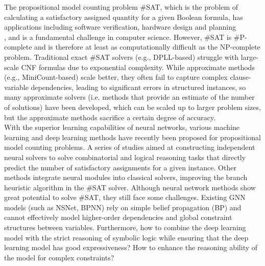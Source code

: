 The propositional model counting problem \#SAT, which is the problem of calculating a satisfactory assigned quantity for a given Boolean formula, has applications including software verification\cite{A1}\cite{A2}, hardware design and planning\cite{B1}\cite{B2}\\ \cite{A3}, and is a fundamental challenge in computer science. However, \#SAT is \#P-complete and is therefore at least as computationally difficult as the NP-complete problem. Traditional exact \#SAT solvers (e.g., DPLL-based)\cite{A4}\cite{A5} struggle with large-scale CNF formulas due to exponential complexity. While approximate methods (e.g., MiniCount-based)\cite{A6} scale better, they often fail to capture complex clause-variable dependencies, leading to significant errors in structured instances, so many approximate solvers (i.e. methods that provide an estimate of the number of solutions) have been developed, which can be scaled up to larger problem sizes, but the approximate methods sacrifice a certain degree of accuracy.\\
With the superior learning capabilities of neural networks, various machine learning and deep learning methods have recently been proposed for propositional model counting problems\cite{A7}\cite{B3}\cite{B4}. A series of studies aimed at constructing independent neural solvers to solve combinatorial and logical reasoning tasks that directly predict the number of satisfactory assignments for a given instance\cite{A8}\cite{A9}. Other methods integrate neural modules into classical solvers, improving the branch heuristic algorithm in the \#SAT solver\cite{A10}. Although neural network methods show great potential to solve \#SAT, they still face some challenges. Existing GNN models (such as NSNet\cite{A11}, BPNN\cite{A12}) rely on simple belief propagation (BP) and cannot effectively model higher-order dependencies and global constraint structures between variables. Furthermore, how to combine the deep learning model with the strict reasoning of symbolic logic while ensuring that the deep learning model has good expressiveness?\cite{A12} How to enhance the reasoning ability of the model for complex constraints?\cite{A14}\\
